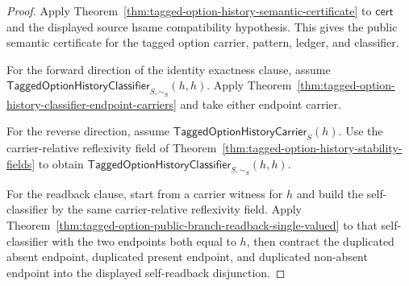 \begin{proof}
Apply Theorem~\ref{thm:tagged-option-history-semantic-certificate} to
$\mathsf{cert}$ and the displayed source hsame compatibility hypothesis. This
gives the public semantic certificate for the tagged option carrier, pattern,
ledger, and classifier.

For the forward direction of the identity exactness clause, assume
$\mathsf{TaggedOptionHistoryClassifier}_{S,\sim_S}(h,h)$. Apply
Theorem~\ref{thm:tagged-option-history-classifier-endpoint-carriers} and take
either endpoint carrier.

For the reverse direction, assume $\mathsf{TaggedOptionHistoryCarrier}_S(h)$.
Use the carrier-relative reflexivity field of
Theorem~\ref{thm:tagged-option-history-stability-fields} to obtain
$\mathsf{TaggedOptionHistoryClassifier}_{S,\sim_S}(h,h)$.

For the readback clause, start from a carrier witness for $h$ and build the
self-classifier by the same carrier-relative reflexivity field. Apply
Theorem~\ref{thm:tagged-option-public-branch-readback-single-valued} to that
self-classifier with the two endpoints both equal to $h$, then contract the
duplicated absent endpoint, duplicated present endpoint, and duplicated
non-absent endpoint into the displayed self-readback disjunction.
\end{proof}
